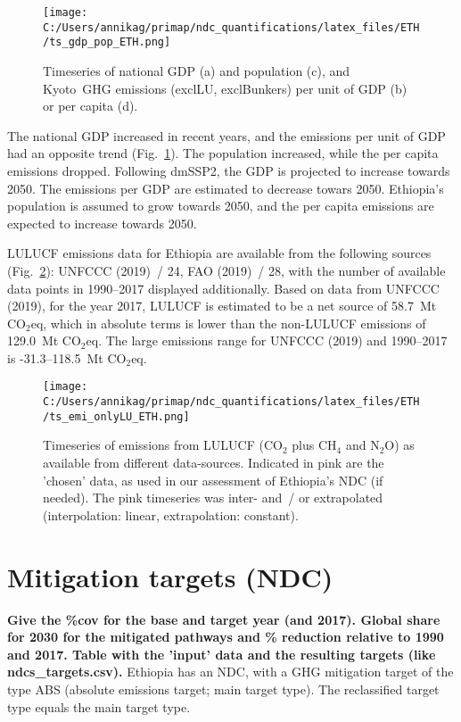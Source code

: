 \documentclass[12pt]{article}
\begin{document}
 \begin{figure}[H]
 \centering
 \texttt{[image: C:/Users/annikag/primap/ndc\_quantifications/latex\_files/ETH/ts\_gdp\_pop\_ETH.png]}
 \caption{Timeseries of national GDP (a) and population (c), and Kyoto~GHG emissions (exclLU, exclBunkers) per unit of GDP (b) or per capita (d).}
 \label{fig:tsSocioEco}
 \end{figure}

 The national GDP increased in recent years, and the emissions per unit of GDP had an opposite trend (Fig.~\ref{fig:tsSocioEco}).
 The population increased, while the per capita emissions dropped. 
 Following dmSSP2, the GDP is projected to increase towards 2050. 
 The emissions per GDP are estimated to decrease towars 2050. 
 Ethiopia's population is assumed to grow towards 2050, and the per capita emissions are expected to increase towards 2050. 

 LULUCF emissions data for Ethiopia are available from the following sources (Fig.~\ref{fig:tsLULUCF}): UNFCCC (2019)~/ 24, FAO (2019)~/ 28, with the number of available data points in 1990--2017 displayed additionally.
 Based on data from UNFCCC (2019), for the year 2017, LULUCF is estimated to be a net source of 58.7~Mt CO$_2$eq, which in absolute terms is lower than the non-LULUCF emissions of 129.0~Mt CO$_2$eq.
 The large emissions range for UNFCCC (2019) and 1990--2017 is -31.3--118.5~Mt CO$_2$eq.

 \begin{figure}[H]
 \centering
 \texttt{[image: C:/Users/annikag/primap/ndc\_quantifications/latex\_files/ETH/ts\_emi\_onlyLU\_ETH.png]}
 \caption{Timeseries of emissions from LULUCF (CO$_2$ plus CH$_4$ and N$_2$O) as available from different data-sources. 
 Indicated in pink are the 'chosen' data, as used in our assessment of Ethiopia's NDC (if needed). 
 The pink timeseries was inter- and~/ or extrapolated (interpolation: linear, extrapolation: constant).}
 \label{fig:tsLULUCF}
 \end{figure}

 \newpage %
 \section{Mitigation targets (NDC)}
 \label{sec:mitiTars}

 \textbf{ 
 Give the \%cov for the base and target year (and 2017). \newline
 Global share for 2030 for the mitigated pathways and \% reduction relative to 1990 and 2017. \newline
 Table with the 'input' data and the resulting targets (like ndcs\_targets.csv). \newline}
 Ethiopia has an NDC, with a GHG mitigation target of the type ABS (absolute emissions target; main target type).
 The reclassified target type equals the main target type.
\end{document}
